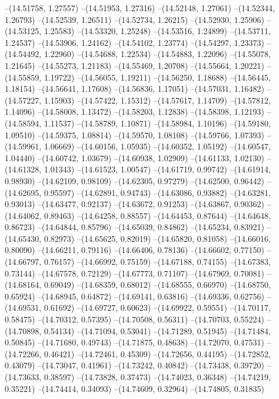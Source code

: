 --(14.51758, 1.27557)
--(14.51953, 1.27316)
--(14.52148, 1.27061)
--(14.52344, 1.26793)
--(14.52539, 1.26511)
--(14.52734, 1.26215)
--(14.52930, 1.25906)
--(14.53125, 1.25583)
--(14.53320, 1.25248)
--(14.53516, 1.24899)
--(14.53711, 1.24537)
--(14.53906, 1.24162)
--(14.54102, 1.23774)
--(14.54297, 1.23373)
--(14.54492, 1.22960)
--(14.54688, 1.22534)
--(14.54883, 1.22096)
--(14.55078, 1.21645)
--(14.55273, 1.21183)
--(14.55469, 1.20708)
--(14.55664, 1.20221)
--(14.55859, 1.19722)
--(14.56055, 1.19211)
--(14.56250, 1.18688)
--(14.56445, 1.18154)
--(14.56641, 1.17608)
--(14.56836, 1.17051)
--(14.57031, 1.16482)
--(14.57227, 1.15903)
--(14.57422, 1.15312)
--(14.57617, 1.14709)
--(14.57812, 1.14096)
--(14.58008, 1.13472)
--(14.58203, 1.12838)
--(14.58398, 1.12193)
--(14.58594, 1.11537)
--(14.58789, 1.10871)
--(14.58984, 1.10196)
--(14.59180, 1.09510)
--(14.59375, 1.08814)
--(14.59570, 1.08108)
--(14.59766, 1.07393)
--(14.59961, 1.06669)
--(14.60156, 1.05935)
--(14.60352, 1.05192)
--(14.60547, 1.04440)
--(14.60742, 1.03679)
--(14.60938, 1.02909)
--(14.61133, 1.02130)
--(14.61328, 1.01343)
--(14.61523, 1.00547)
--(14.61719, 0.99742)
--(14.61914, 0.98930)
--(14.62109, 0.98109)
--(14.62305, 0.97279)
--(14.62500, 0.96442)
--(14.62695, 0.95597)
--(14.62891, 0.94743)
--(14.63086, 0.93882)
--(14.63281, 0.93013)
--(14.63477, 0.92137)
--(14.63672, 0.91253)
--(14.63867, 0.90362)
--(14.64062, 0.89463)
--(14.64258, 0.88557)
--(14.64453, 0.87644)
--(14.64648, 0.86723)
--(14.64844, 0.85796)
--(14.65039, 0.84862)
--(14.65234, 0.83921)
--(14.65430, 0.82973)
--(14.65625, 0.82019)
--(14.65820, 0.81058)
--(14.66016, 0.80090)
--(14.66211, 0.79116)
--(14.66406, 0.78136)
--(14.66602, 0.77150)
--(14.66797, 0.76157)
--(14.66992, 0.75159)
--(14.67188, 0.74155)
--(14.67383, 0.73144)
--(14.67578, 0.72129)
--(14.67773, 0.71107)
--(14.67969, 0.70081)
--(14.68164, 0.69049)
--(14.68359, 0.68012)
--(14.68555, 0.66970)
--(14.68750, 0.65924)
--(14.68945, 0.64872)
--(14.69141, 0.63816)
--(14.69336, 0.62756)
--(14.69531, 0.61692)
--(14.69727, 0.60623)
--(14.69922, 0.59551)
--(14.70117, 0.58475)
--(14.70312, 0.57395)
--(14.70508, 0.56311)
--(14.70703, 0.55224)
--(14.70898, 0.54134)
--(14.71094, 0.53041)
--(14.71289, 0.51945)
--(14.71484, 0.50845)
--(14.71680, 0.49743)
--(14.71875, 0.48638)
--(14.72070, 0.47531)
--(14.72266, 0.46421)
--(14.72461, 0.45309)
--(14.72656, 0.44195)
--(14.72852, 0.43079)
--(14.73047, 0.41961)
--(14.73242, 0.40842)
--(14.73438, 0.39720)
--(14.73633, 0.38597)
--(14.73828, 0.37473)
--(14.74023, 0.36348)
--(14.74219, 0.35221)
--(14.74414, 0.34093)
--(14.74609, 0.32964)
--(14.74805, 0.31835)
